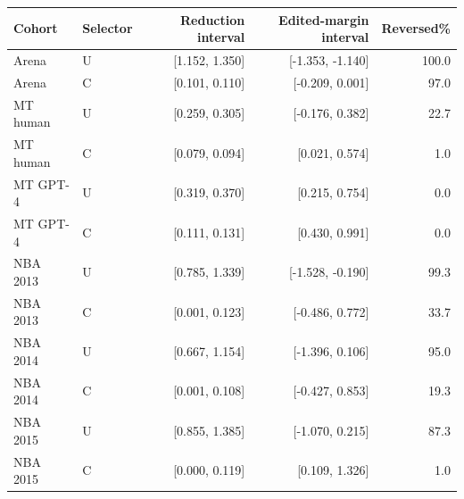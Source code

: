 \begin{tabular}{llrrr}
\toprule
Cohort & Selector & Reduction interval & Edited-margin interval & Reversed\% \\
\midrule
Arena & U & [1.152, 1.350] & [-1.353, -1.140] & 100.0 \\
Arena & C & [0.101, 0.110] & [-0.209, 0.001] & 97.0 \\
MT human & U & [0.259, 0.305] & [-0.176, 0.382] & 22.7 \\
MT human & C & [0.079, 0.094] & [0.021, 0.574] & 1.0 \\
MT GPT-4 & U & [0.319, 0.370] & [0.215, 0.754] & 0.0 \\
MT GPT-4 & C & [0.111, 0.131] & [0.430, 0.991] & 0.0 \\
NBA 2013 & U & [0.785, 1.339] & [-1.528, -0.190] & 99.3 \\
NBA 2013 & C & [0.001, 0.123] & [-0.486, 0.772] & 33.7 \\
NBA 2014 & U & [0.667, 1.154] & [-1.396, 0.106] & 95.0 \\
NBA 2014 & C & [0.001, 0.108] & [-0.427, 0.853] & 19.3 \\
NBA 2015 & U & [0.855, 1.385] & [-1.070, 0.215] & 87.3 \\
NBA 2015 & C & [0.000, 0.119] & [0.109, 1.326] & 1.0 \\
\bottomrule
\end{tabular}
